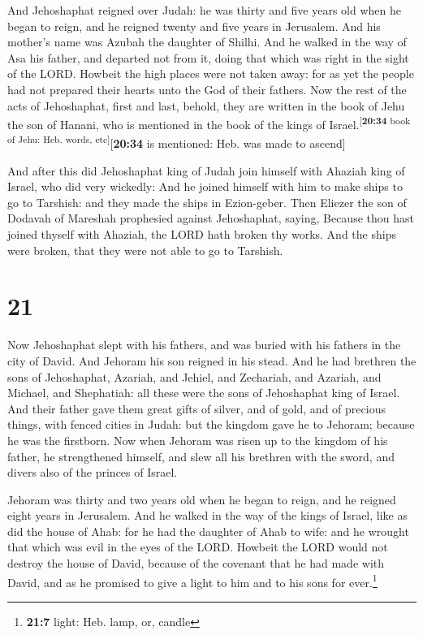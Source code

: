  And Jehoshaphat reigned over Judah: he was thirty and
five years old when he began to reign, and he reigned twenty and five
years in Jerusalem. And his mother's name was Azubah the daughter of
Shilhi.  And he walked in the way of Asa his father, and
departed not from it, doing that which was right in the sight of the
LORD.  Howbeit the high places were not taken away: for
as yet the people had not prepared their hearts unto the God of their
fathers.  Now the rest of the acts of Jehoshaphat, first
and last, behold, they are written in the book of Jehu the son of
Hanani, who is mentioned in the book of the kings of
Israel.\textsuperscript{{[}\textbf{20:34} book of Jehu: Heb. words,
etc{]}}{[}\textbf{20:34} is mentioned: Heb. was made to ascend{]}

 And after this did Jehoshaphat king of Judah join
himself with Ahaziah king of Israel, who did very wickedly:
 And he joined himself with him to make ships to go to
Tarshish: and they made the ships in Ezion-geber.  Then
Eliezer the son of Dodavah of Mareshah prophesied against Jehoshaphat,
saying, Because thou hast joined thyself with Ahaziah, the LORD hath
broken thy works. And the ships were broken, that they were not able to
go to Tarshish.

\hypertarget{section-20}{%
\section{21}\label{section-20}}

 Now Jehoshaphat slept with his fathers, and was buried
with his fathers in the city of David. And Jehoram his son reigned in
his stead.  And he had brethren the sons of Jehoshaphat,
Azariah, and Jehiel, and Zechariah, and Azariah, and Michael, and
Shephatiah: all these were the sons of Jehoshaphat king of Israel.
 And their father gave them great gifts of silver, and of
gold, and of precious things, with fenced cities in Judah: but the
kingdom gave he to Jehoram; because he was the firstborn. 
Now when Jehoram was risen up to the kingdom of his father, he
strengthened himself, and slew all his brethren with the sword, and
divers also of the princes of Israel.

 Jehoram was thirty and two years old when he began to
reign, and he reigned eight years in Jerusalem.  And he
walked in the way of the kings of Israel, like as did the house of Ahab:
for he had the daughter of Ahab to wife: and he wrought that which was
evil in the eyes of the LORD.  Howbeit the LORD would not
destroy the house of David, because of the covenant that he had made
with David, and as he promised to give a light to him and to his sons
for ever.\footnote{\textbf{21:7} light: Heb. lamp, or, candle}

